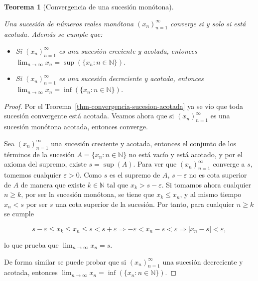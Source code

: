 \documentclass[
  a4paper,
]{scrreport}
\providecommand{\tightlist}{%
  \setlength{\itemsep}{0pt}\setlength{\parskip}{0pt}}\usepackage{longtable,booktabs,array}
\theoremstyle{definition}
\theoremstyle{plain}
\theoremstyle{definition}
\theoremstyle{plain}
\newtheorem{theorem}{Teorema}[chapter]
\theoremstyle{plain}
\theoremstyle{remark}
\begin{document}
\leavevmode{}%
\begin{theorem}[Convergencia de una sucesión
monótona]\label{thm-convergencia-monotona}

Una sucesión de números reales monótona \((x_n)_{n=1}^\infty\) converge
si y solo si está acotada. Además se cumple que:

\begin{itemize}
\tightlist
\item
  Si \((x_n)_{n=1}^\infty\) es una sucesión creciente y acotada,
  entonces \(\lim_{n\to\infty}x_n = \sup(\{x_n:n\in\mathbb{N}\})\).
\item
  Si \((x_n)_{n=1}^\infty\) es una sucesión decreciente y acotada,
  entonces \(\lim_{n\to\infty}x_n = \inf(\{x_n:n\in\mathbb{N}\})\).
\end{itemize}

\end{theorem}

\begin{tcolorbox}[enhanced jigsaw, breakable, arc=.35mm, colbacktitle=quarto-callout-note-color!10!white, toptitle=1mm, opacityback=0, colframe=quarto-callout-note-color-frame, colback=white, left=2mm, bottomrule=.15mm, opacitybacktitle=0.6, title=\textcolor{quarto-callout-note-color}{\faInfo}\hspace{0.5em}{Demostración}, toprule=.15mm, titlerule=0mm, coltitle=black, rightrule=.15mm, bottomtitle=1mm, leftrule=.75mm]

\begin{proof}

Por el Teorema~\ref{thm-convergencia-sucesion-acotada} ya se vio que
toda sucesión convergente está acotada. Veamos ahora que si
\((x_n)_{n=1}^\infty\) es una sucesión monótona acotada, entonces
converge.

Sea \((x_n)_{n=1}^\infty\) una sucesión creciente y acotada, entonces el
conjunto de los términos de la sucesión \(A=\{x_n:n\in\mathbb{N}\}\) no
está vacío y está acotado, y por el axioma del supremo, existe
\(s=\sup(A)\). Para ver que \((x_n)_{n=1}^\infty\) converge a \(s\),
tomemos cualquier \(\varepsilon>0\). Como \(s\) es el supremo de \(A\),
\(s-\varepsilon\) no es cota superior de \(A\) de manera que existe
\(k\in\mathbb{N}\) tal que \(x_k>s-\varepsilon\). Si tomamos ahora
cualquier \(n\geq k\), por ser la sucesión monótona, se tiene que
\(x_k\leq x_n\), y al mismo tiempo \(x_n<s\) por ser \(s\) una cota
superior de la sucesión. Por tanto, para cualquier \(n\geq k\) se cumple

\[
s-\varepsilon \leq x_k\leq x_n\leq s< s+\varepsilon \Rightarrow -\varepsilon < x_n-s <\varepsilon \Rightarrow |x_n-s|<\varepsilon,
\]

lo que prueba que \(\lim_{n\to\infty}x_n = s\).

De forma similar se puede probar que si \((x_n)_{n=1}^\infty\) una
sucesión decreciente y acotada, entonces
\(\lim_{n\to\infty}x_n = \inf(\{x_n:n\in\mathbb{N}\})\).

\end{proof}

\end{tcolorbox}
\end{document}
